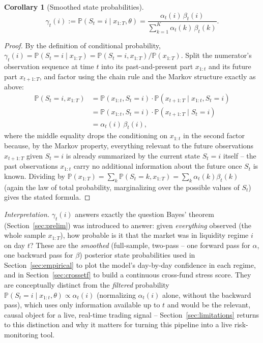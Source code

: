 \documentclass[11pt]{article}
\newtheorem{corollary}[theorem]{Corollary}
\theoremstyle{definition}
\theoremstyle{remark}
\begin{document}
\begin{corollary}[Smoothed state probabilities]
\label{cor:smoothed}
\[
\gamma_t(i) := \mathbb{P}(S_t=i\mid x_{1:T},\theta) = \frac{\alpha_t(i)\,\beta_t(i)}{\sum_{k=1}^K\alpha_t(k)\,\beta_t(k)}.
\]
\end{corollary}
\begin{proof}
By the definition of conditional probability, $\gamma_t(i)=\mathbb{P}(S_t=i\mid x_{1:T})=\mathbb{P}(S_t=i,x_{1:T})/\mathbb{P}(x_{1:T})$. Split the numerator's observation sequence at time $t$ into its past-and-present part $x_{1:t}$ and its future part $x_{t+1:T}$, and factor using the chain rule and the Markov structure exactly as above:
\begin{align*}
\mathbb{P}(S_t=i,x_{1:T}) &= \mathbb{P}(x_{1:t},S_t=i)\cdot\mathbb{P}(x_{t+1:T}\mid x_{1:t},S_t=i) \\
&= \mathbb{P}(x_{1:t},S_t=i)\cdot\mathbb{P}(x_{t+1:T}\mid S_t=i) \\
&= \alpha_t(i)\,\beta_t(i),
\end{align*}
where the middle equality drops the conditioning on $x_{1:t}$ in the second factor because, by the Markov property, everything relevant to the future observations $x_{t+1:T}$ given $S_t=i$ is already summarized by the current state $S_t=i$ itself -- the past observations $x_{1:t}$ carry no additional information about the future once $S_t$ is known. Dividing by $\mathbb{P}(x_{1:T})=\sum_k\mathbb{P}(S_t=k,x_{1:T})=\sum_k\alpha_t(k)\beta_t(k)$ (again the law of total probability, marginalizing over the possible values of $S_t$) gives the stated formula.
\end{proof}
\emph{Interpretation.} $\gamma_t(i)$ answers exactly the question Bayes' theorem (Section~\ref{sec:prelim}) was introduced to answer: given \emph{everything} observed (the whole sample $x_{1:T}$), how probable is it that the market was in liquidity regime $i$ on day $t$? These are the \emph{smoothed} (full-sample, two-pass -- one forward pass for $\alpha$, one backward pass for $\beta$) posterior state probabilities used in Section~\ref{sec:empirical} to plot the model's day-by-day confidence in each regime, and in Section~\ref{sec:crossetf} to build a continuous cross-fund stress score. They are conceptually distinct from the \emph{filtered} probability $\mathbb{P}(S_t=i\mid x_{1:t},\theta)\propto\alpha_t(i)$ (normalizing $\alpha_t(i)$ alone, without the backward pass), which uses only information available up to $t$ and would be the relevant, causal object for a live, real-time trading signal -- Section~\ref{sec:limitations} returns to this distinction and why it matters for turning this pipeline into a live risk-monitoring tool.
\end{document}
